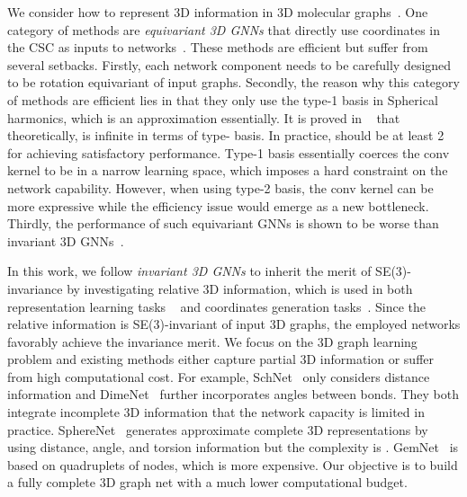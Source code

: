 \documentclass{article}
\begin{document}
We consider how to represent 3D information in 3D molecular graphs~\citep{atz2021geometric,bronstein2021geometric}.
One category of methods are \textit{equivariant 3D GNNs} that directly use coordinates in the CSC as inputs to  networks~\citep{thomas2018tensor,anderson2019cormorant,fuchs2020se,schutt2021equivariant,batzner2021se}. 
These methods are efficient but suffer from several setbacks.
Firstly, each network component needs to be carefully designed to be rotation equivariant of input graphs. 
Secondly, the reason why this category of methods are efficient lies in that they only use the type-1 basis in Spherical harmonics, which is an approximation essentially. It is proved in ~\citep{thomas2018tensor} that theoretically,  is infinite in terms of type- basis. In practice,  should be at least 2 for achieving satisfactory performance. Type-1 basis essentially coerces the conv kernel to be in a narrow learning space, which imposes a hard constraint on the network capability.
However, when using type-2 basis, the conv kernel can be more expressive while the efficiency issue
would emerge as a new bottleneck.
Thirdly, the performance of such equivariant GNNs is
shown to be worse than invariant 3D GNNs~\citep{liu2022spherical}.


In this work, we follow \textit{invariant 3D GNNs} to inherit the merit of SE(3)-invariance by investigating
relative 3D information, which is used in both representation learning tasks
~\citep{schutt2017schnet,klicpera_dimenet_2020,klicpera_dimenetpp_2020,shuaibi2021rotation,liu2022spherical,klicpera2021gemnet}
and coordinates generation tasks~\citep{ganea2021geomol,Simm2020Reinforcement,Simm2021SymmetryAware,xu2021molecule3d,jumper2021highly,baek2021accurate}.
Since the relative information is SE(3)-invariant of input 3D graphs, the employed networks favorably achieve the invariance merit.
We focus on the 3D graph learning problem and existing methods either capture partial 3D information or suffer from high computational cost.
For example, SchNet~\cite{schutt2017schnet} only considers distance information and  DimeNet~\cite{klicpera_dimenet_2020} further incorporates angles between bonds. They both integrate incomplete 3D information that the network capacity is limited in practice.
SphereNet~\cite{liu2022spherical} generates approximate complete 3D representations by using
distance, angle, and torsion information but the complexity is .
GemNet~\cite{klicpera2021gemnet} is based on quadruplets of nodes, which is more expensive. Our objective is to build a fully complete 3D graph net with a much lower computational budget.
\end{document}
